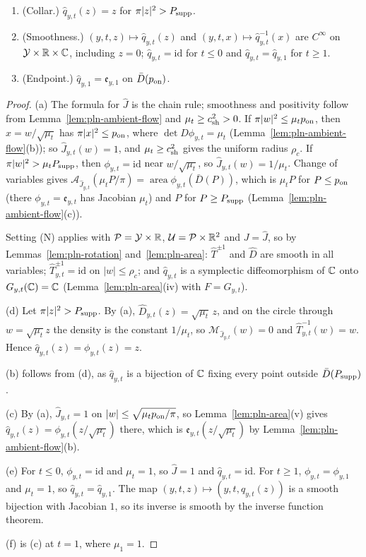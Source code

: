 \begin{lemma}
\begin{enumerate}[label=(\alph*)]
 $\pi|z|^2\le c_{\rm sh}^2p_{\rm on}$.
\item (Collar.) $\hat q_{y,t}(z)=z$ for $\pi|z|^2>P_{\rm supp}$.
\item (Smoothness.) $(y,t,z)\mapsto\hat q_{y,t}(z)$ and $(y,t,x)\mapsto\hat q_{y,t}^{-1}(x)$ are $C^\infty$ on $\mathcal Y\times\mathbb{R}\times\mathbb{C}$,
 including $z=0$; $\hat q_{y,t}=\mathrm{id}$ for $t\le0$ and $\hat q_{y,t}=\hat q_{y,1}$ for $t\ge1$.
\item (Endpoint.) $\hat q_{y,1}=\mathfrak e_{y,1}$ on $\bar D(p_{\rm on})$.
\end{enumerate}
\end{lemma}

\begin{proof}
(a) The formula for $\hat J$ is the chain rule; smoothness and positivity follow from Lemma~\ref{lem:pln-ambient-flow} and $\mu_t\ge c_{\rm sh}^2>0$. If $\pi|w|^2\le\mu_tp_{\rm on}$, then $x=w/\sqrt{\mu_t}$ has $\pi|x|^2\le p_{\rm on}$, where $\det D\phi_{y,t}=\mu_t$ (Lemma~\ref{lem:pln-ambient-flow}(b)); so $\hat J_{y,t}(w)=1$, and $\mu_t\ge c_{\rm sh}^2$ gives the uniform radius $\rho_c$. If $\pi|w|^2>\mu_tP_{\rm supp}$, then $\phi_{y,t}=\mathrm{id}$ near $w/\sqrt{\mu_t}$, so $\hat J_{y,t}(w)=1/\mu_t$. Change of variables gives $\mathcal A_{\hat J_{y,t}}(\mu_tP/\pi)=\operatorname{area}\phi_{y,t}(\bar D(P))$, which is $\mu_tP$ for $P\le p_{\rm on}$ (there $\phi_{y,t}=\mathfrak e_{y,t}$ has Jacobian $\mu_t$) and $P$ for $P\ge P_{\rm supp}$ (Lemma~\ref{lem:pln-ambient-flow}(c)).

Setting (N) applies with $\mathcal P=\mathcal Y\times\mathbb{R}$, $\mathcal U=\mathcal P\times\mathbb{R}^2$ and $J=\hat J$, so by Lemmas~\ref{lem:pln-rotation} and~\ref{lem:pln-area}: $\hat T^{\pm1}$ and $\hat D$ are smooth in all variables; $\hat T^{\pm1}_{y,t}=\mathrm{id}$ on $|w|\le\rho_c$; and $\hat q_{y,t}$ is a symplectic diffeomorphism of $\mathbb{C}$ onto $G_{y,t}(\mathbb{C})=\mathbb{C}$ (Lemma~\ref{lem:pln-area}(iv) with $F=G_{y,t}$).

(d) Let $\pi|z|^2>P_{\rm supp}$. By (a), $\hat D_{y,t}(z)=\sqrt{\mu_t}\,z$, and on the circle through $w=\sqrt{\mu_t}z$ the density is the constant $1/\mu_t$, so $\mathcal M_{\hat J_{y,t}}(w)=0$ and $\hat T_{y,t}^{-1}(w)=w$. Hence $\hat q_{y,t}(z)=\phi_{y,t}(z)=z$.

(b) follows from (d), as $\hat q_{y,t}$ is a bijection of $\mathbb{C}$ fixing every point outside $\bar D(P_{\rm supp})$.

(c) By (a), $\hat J_{y,t}=1$ on $|w|\le\sqrt{\mu_tp_{\rm on}/\pi}$, so Lemma~\ref{lem:pln-area}(v) gives $\hat q_{y,t}(z)=\phi_{y,t}(z/\sqrt{\mu_t})$ there, which is $\mathfrak e_{y,t}(z/\sqrt{\mu_t})$ by Lemma~\ref{lem:pln-ambient-flow}(b).

(e) For $t\le0$, $\phi_{y,t}=\mathrm{id}$ and $\mu_t=1$, so $\hat J=1$ and $\hat q_{y,t}=\mathrm{id}$. For $t\ge1$, $\phi_{y,t}=\phi_{y,1}$ and $\mu_t=1$, so $\hat q_{y,t}=\hat q_{y,1}$. The map $(y,t,z)\mapsto(y,t,\hat q_{y,t}(z))$ is a smooth bijection with Jacobian $1$, so its inverse is smooth by the inverse function theorem.

(f) is (c) at $t=1$, where $\mu_1=1$.
\end{proof}

